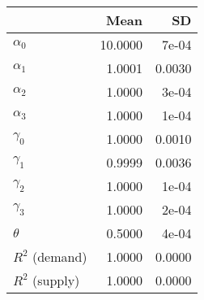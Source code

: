 
\begin{tabular}[t]{lrr}
\toprule
  & Mean & SD\\
\midrule
$\alpha_{0}$ & 10.0000 & 7e-04\\
$\alpha_{1}$ & 1.0001 & 0.0030\\
$\alpha_{2}$ & 1.0000 & 3e-04\\
$\alpha_{3}$ & 1.0000 & 1e-04\\
$\gamma_{0}$ & 1.0000 & 0.0010\\
$\gamma_{1}$ & 0.9999 & 0.0036\\
$\gamma_{2}$ & 1.0000 & 1e-04\\
$\gamma_{3}$ & 1.0000 & 2e-04\\
$\theta$ & 0.5000 & 4e-04\\
$R^{2}$ (demand) & 1.0000 & 0.0000\\
$R^{2}$ (supply) & 1.0000 & 0.0000\\
\bottomrule
\end{tabular}
